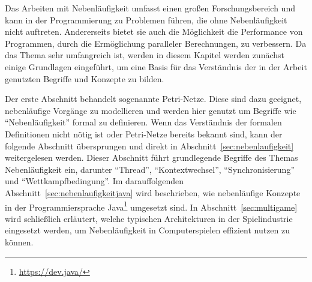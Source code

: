 Das Arbeiten mit Nebenläufigkeit umfasst einen großen Forschungsbereich und kann in der Programmierung zu Problemen führen, die ohne Nebenläufigkeit nicht auftreten. Andererseits bietet sie auch die Möglichkeit die Performance von Programmen, durch die Ermöglichung paralleler Berechnungen, zu verbessern. Da das Thema sehr umfangreich ist, werden in diesem Kapitel werden zunächst einige Grundlagen eingeführt, um eine Basis für das Verständnis der in der Arbeit genutzten Begriffe und Konzepte zu bilden. 

Der erste Abschnitt behandelt sogenannte Petri-Netze. Diese sind dazu geeignet, nebenläufige Vorgänge zu modellieren und werden hier genutzt um Begriffe wie \enquote{Nebenläufigkeit} formal zu definieren. Wenn das Verständnis der formalen Definitionen nicht nötig ist oder Petri-Netze bereits bekannt sind, kann der folgende Abschnitt übersprungen und direkt in Abschnitt~\ref{sec:nebenlaufigkeit} weitergelesen werden. Dieser Abschnitt führt grundlegende Begriffe des Themas Nebenläufigkeit ein, darunter \enquote{Thread}, \enquote{Kontextwechsel}, \enquote{Synchronisierung} und \enquote{Wettkampfbedingung}. Im darauffolgenden Abschnitt~\ref{sec:nebenlaufigkeitjava} wird beschrieben, wie nebenläufige Konzepte in der Programmiersprache Java\footnote{\url{https://dev.java/}} umgesetzt sind. In Abschnitt~\ref{sec:multigame} wird schließlich erläutert, welche typischen Architekturen in der Spielindustrie eingesetzt werden, um Nebenläufigkeit in Computerspielen effizient nutzen zu können.